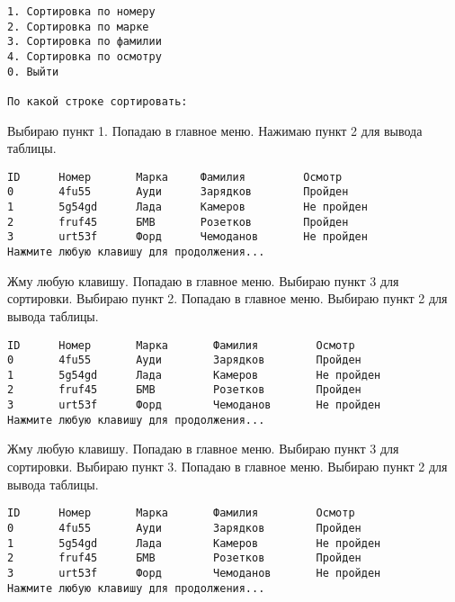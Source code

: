 \begin{tcolorbox}
\begin{verbatim}
1. Сортировка по номеру
2. Сортировка по марке  
3. Сортировка по фамилии
4. Сортировка по осмотру
0. Выйти

По какой строке сортировать: 
\end{verbatim}
\end{tcolorbox}

Выбираю пункт 1. Попадаю в главное меню. Нажимаю пункт 2 для вывода таблицы.

\begin{tcolorbox}
\begin{verbatim}
ID      Номер       Марка     Фамилия         Осмотр
0       4fu55       Ауди      Зарядков        Пройден
1       5g54gd      Лада      Камеров         Не пройден
2       fruf45      БМВ       Розетков        Пройден
3       urt53f      Форд      Чемоданов       Не пройден
Нажмите любую клавишу для продолжения...
\end{verbatim}
\end{tcolorbox}

Жму любую клавишу. Попадаю в главное меню. Выбираю пункт 3 для сортировки. Выбираю пункт 2. Попадаю в главное меню. Выбираю пункт 2 для вывода таблицы.

\begin{tcolorbox}
\begin{verbatim}
ID      Номер       Марка       Фамилия         Осмотр
0       4fu55       Ауди        Зарядков        Пройден
1       5g54gd      Лада        Камеров         Не пройден
2       fruf45      БМВ         Розетков        Пройден
3       urt53f      Форд        Чемоданов       Не пройден
Нажмите любую клавишу для продолжения...
\end{verbatim}
\end{tcolorbox}

Жму любую клавишу. Попадаю в главное меню. Выбираю пункт 3 для сортировки. Выбираю пункт 3. Попадаю в главное меню. Выбираю пункт 2 для вывода таблицы.

\begin{tcolorbox}
\begin{verbatim}
ID      Номер       Марка       Фамилия         Осмотр
0       4fu55       Ауди        Зарядков        Пройден
1       5g54gd      Лада        Камеров         Не пройден
2       fruf45      БМВ         Розетков        Пройден
3       urt53f      Форд        Чемоданов       Не пройден
Нажмите любую клавишу для продолжения...
\end{verbatim}
\end{tcolorbox}

